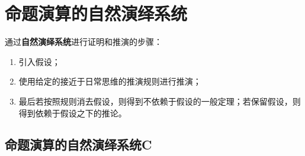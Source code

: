 \documentclass[12pt,onecolumn,a4paper]{book}
\numberwithin{table}{subsection}
\numberwithin{equation}{subsection}
\begin{document}
\section{命题演算的自然演绎系统}

通过\textbf{自然演绎系统}进行证明和推演的步骤：
\begin{enumerate}[itemsep=0pt,parsep=0pt]
    \item 引入假设；
    \item 使用给定的接近于日常思维的推演规则进行推演；
    \item 最后若按照规则消去假设，则得到不依赖于假设的一般定理；若保留假设，则得到依赖于假设之下的推论。
\end{enumerate}


\subsection{命题演算的自然演绎系统C}
\end{document}
